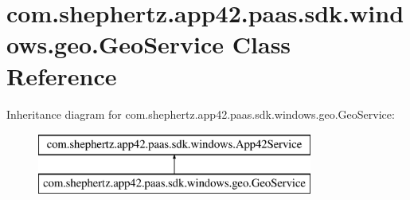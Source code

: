 \hypertarget{classcom_1_1shephertz_1_1app42_1_1paas_1_1sdk_1_1windows_1_1geo_1_1_geo_service}{\section{com.\+shephertz.\+app42.\+paas.\+sdk.\+windows.\+geo.\+Geo\+Service Class Reference}
\label{classcom_1_1shephertz_1_1app42_1_1paas_1_1sdk_1_1windows_1_1geo_1_1_geo_service}
}


 


Inheritance diagram for com.\+shephertz.\+app42.\+paas.\+sdk.\+windows.\+geo.\+Geo\+Service\+:\begin{figure}[H]
\begin{center}
\leavevmode
\includegraphics[height=2.000000cm]{classcom_1_1shephertz_1_1app42_1_1paas_1_1sdk_1_1windows_1_1geo_1_1_geo_service}
\end{center}
\end{figure}
